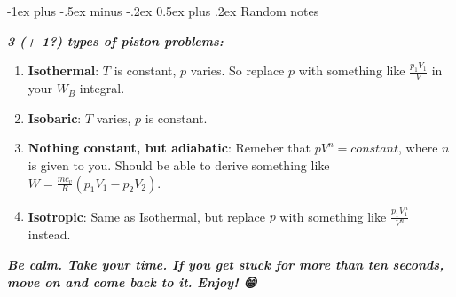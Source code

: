 \documentclass[10pt,landscape,letterpaper]{article}
\makeatletter
\renewcommand{\subsection}{\@startsection{subsection}{2}{0mm}%
                                {-1ex plus -.5ex minus -.2ex}%
                                {0.5ex plus .2ex}%
                                {\normalfont\normalsize\bfseries}}
\newcommand{\fsheetlabel}[1]{\textcolor{FSheetLabelColor}{\textbf{\textit{#1}}}}
\makeatother
\begin{document}
\begin{multicols*}{3}
    \begin{minipage}{\columnwidth}\raggedright
        \subsection{Random notes}
        
        \fsheetlabel{3 (+ 1?) types of piston problems:}
        
        \begin{enumerate}
            \item \textbf{Isothermal}: $T$ is constant, $p$ varies. So replace $p$ with something like $\frac{p_1 V_1}{V}$ in your $W_B$ integral.
            \item \textbf{Isobaric}: $T$ varies, $p$ is constant.
            \item \textbf{Nothing constant, but adiabatic}: Remeber that $pV^n = constant$, where $n$ is given to you. Should be able to derive something like $W = \frac{m c_v}{R}(p_1 V_1 - p_2 V_2)$.
            \item \textbf{Isotropic}: Same as Isothermal, but replace $p$ with something like $\frac{p_1 V_1^n}{V^n}$ instead.
        \end{enumerate}
    
        \fsheetlabel{Be calm. Take your time. If you get stuck for more than ten seconds, move on and come back to it. Enjoy! 😁}
    \end{minipage}
    
    \end{multicols*}
\end{document}
